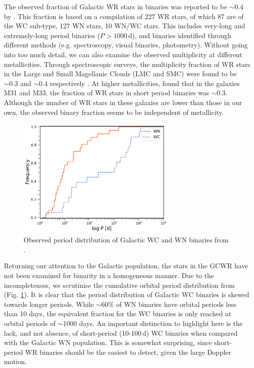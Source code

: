 The observed fraction of Galactic WR stars in binaries was reported to be ${\sim}0.4$ by  . This fraction is based on a compilation of 227 WR stars, of which 87 are of the WC sub-type, 127 WN stars, 10 WN/WC stars. This includes very-long and extremely-long period binaries ($P>1000\,$d), and binaries identified through different methods (e.g. spectroscopy, visual binaries, photometry). Without going into too much detail, we can also examine the observed multiplicity at different metallicities. Through spectroscopic surveys, the multiplicity fraction of WR stars in the Large and Small Magellanic Clouds (LMC and SMC) were found to be ${\sim}0.3$ and ${\sim}0.4$ respectively \citep{bartzakos_magellanic_2001,foellmi_wolf-rayet_2003,foellmi_wolf-rayet_2003-1,schnurr_spectroscopic_2008}. At higher metallicities, \citet{neugent_close_2014} found that in the galaxies M31 and M33, the fraction of WR stars in short period binaries was ${\sim}0.3$.  Although the number of WR stars in these galaxies are lower than those in our own, the observed binary fraction seems to be independent of metallicity. 


\begin{figure}
    \centering
    \includegraphics[width=0.7\textwidth]{chapters/introduction/image/Cumulative_pobs_withdust.pdf}
    \caption{Observed period distribution of Galactic WC and WN binaries from .}
    \label{fig:obs_pdist}
\end{figure}

Returning our attention to the Galactic population, the stars in the GCWR have not been examined for binarity in a homogeneous manner. Due to the incompleteness, we scrutinise the cumulative orbital period distribution from  (Fig. \ref{fig:obs_pdist}). It is clear that the period distribution of Galactic WC binaries is skewed towards longer periods. While ${\sim}60$\% of WN binaries have orbital periods less than 10 days, the equivalent fraction for the WC binaries is only reached at orbital periods of ${\sim}$1000 days. An important distinction to highlight here is the lack, and not absence, of short-period (10-100\,d) WC binaries when compared with the Galactic WN population. This is somewhat surprising, since short-period WR binaries should be the easiest to detect, given the large Doppler motion. 


